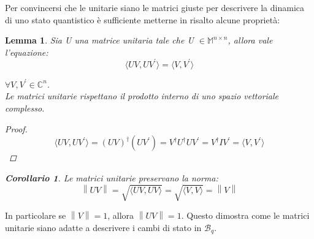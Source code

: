\documentclass[12pt,a4paper,openright]{report}
\newcommand{\norm}[1]{\left\lVert#1\right\rVert}
\newtheorem{mylem}{Lemma}
\newtheorem*{mycor}{Corollario}
\begin{document}
Per convincersi che le unitarie siano le matrici giuste per descrivere la dinamica di uno stato quantistico è sufficiente metterne in risalto alcune proprietà:
\newpage
\begin{mylem}
    Sia U una matrice unitaria tale che U $\in \mathbb{M}^{n\times{n}}$, allora vale l'equazione:
    \[
        \langle{UV,UV^{'}}\rangle = \langle{V,V^{'}}\rangle 
    \]
    
  $\forall V,V^{'} \in \mathbb{C}^n$.\\
  Le matrici unitarie rispettano il prodotto interno di uno spazio vettoriale complesso.
  \begin{proof}
      \[
        \langle{UV,UV^{'}}\rangle = (UV)^{\dag}(UV^{'}) = V^{\dag}U^{\dag}UV^{'} = V^{\dag}IV^{'} = \langle{V,V^{'}}\rangle
      \]
  \end{proof}
  \begin{mycor}
      Le matrici unitarie preservano la norma:
      \[
            \norm{UV} = \sqrt{\langle{UV,UV}\rangle} = \sqrt{\langle{V,V}\rangle} = \norm{V} 
      \]
   \end{mycor}
  
\end{mylem}

In particolare se $\norm{V}=1$, allora $\norm{UV}=1$. Questo dimostra come le matrici unitarie siano adatte a descrivere i cambi di stato in $\mathcal{B}_q$.\par
\end{document}

